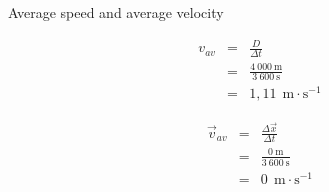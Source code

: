 \begin{wex}{Average speed and average velocity}
{
\begin{eqnarray*}
v_{av}&=&\frac{D}{\Delta t}\\
&=&\frac{4\ 000\ \text{m}}{3\ 600\ \text{s}}\\
&=&1,11\ ~\text{m}\cdot \text{s}^{-1}
\end{eqnarray*}

\begin{eqnarray*}
{\vec{v}_{av}}&=&\frac{\Delta \vec{x}}{\Delta t}\\
&=&\frac{0\ \text{m}}{3\ 600\ \text{s}}\\
&=& 0\ ~\text{m}\cdot \text{s}^{-1}
\end{eqnarray*}}
\end{wex}


    \noindent
      \label{m38791*uid37}
